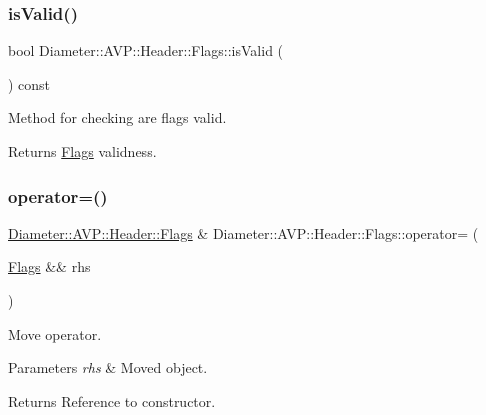 \subsubsection{\texorpdfstring{is\+Valid()}{isValid()}}
{\footnotesize\ttfamily bool Diameter\+::\+A\+V\+P\+::\+Header\+::\+Flags\+::is\+Valid (\begin{DoxyParamCaption}{ }\end{DoxyParamCaption}) const}



Method for checking are flags valid. 

\begin{DoxyReturn}{Returns}
\hyperlink{classDiameter_1_1AVP_1_1Header_1_1Flags}{Flags} validness. 
\end{DoxyReturn}
\mbox{\label{classDiameter_1_1AVP_1_1Header_1_1Flags_aef292134b9d9f7c46a382ffdf95327ba}} 
\subsubsection{\texorpdfstring{operator=()}{operator=()}\hspace{0.1cm}{\footnotesize\ttfamily [1/2]}}
{\footnotesize\ttfamily \hyperlink{classDiameter_1_1AVP_1_1Header_1_1Flags}{Diameter\+::\+A\+V\+P\+::\+Header\+::\+Flags} \& Diameter\+::\+A\+V\+P\+::\+Header\+::\+Flags\+::operator= (\begin{DoxyParamCaption}\item[{\hyperlink{classDiameter_1_1AVP_1_1Header_1_1Flags}{Flags} \&\&}]{rhs }\end{DoxyParamCaption})\hspace{0.3cm}{\ttfamily [noexcept]}}



Move operator. 


\begin{DoxyParams}{Parameters}
{\em rhs} & Moved object. \\
\hline
\end{DoxyParams}
\begin{DoxyReturn}{Returns}
Reference to constructor. 
\end{DoxyReturn}
\mbox{\label{classDiameter_1_1AVP_1_1Header_1_1Flags_a7d71a49f3122bd5930a6b93b482999ce}} 
